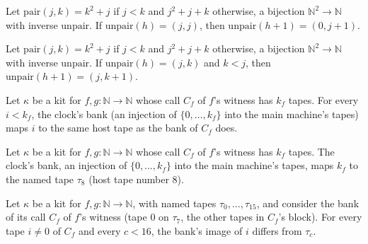 \begin{theorem}
\label{Turing.NTimeDiag.qy_unpair_succ_diag}
\leanok
{}
Let $\mathrm{pair}(j, k) = k^2 + j$ if $j < k$ and $j^2 + j + k$ otherwise, a bijection
$\mathbb{N}^2 \to \mathbb{N}$ with inverse $\mathrm{unpair}$. If $\mathrm{unpair}(h) = (j, j)$, then
$\mathrm{unpair}(h + 1) = (0, j + 1)$.
\end{theorem}

\begin{theorem}
\label{Turing.NTimeDiag.qy_unpair_succ_gt}
\leanok
{}
Let $\mathrm{pair}(j, k) = k^2 + j$ if $j < k$ and $j^2 + j + k$ otherwise, a bijection
$\mathbb{N}^2 \to \mathbb{N}$ with inverse $\mathrm{unpair}$. If $\mathrm{unpair}(h) = (j, k)$ and
$k < j$, then $\mathrm{unpair}(h + 1) = (j, k + 1)$.
\end{theorem}

\begin{theorem}
\label{Turing.NTimeDiag.QyKit.bClk_castSucc}
\leanok
{}
Let $\kappa$ be a kit for $f, g : \mathbb{N} \to \mathbb{N}$ whose call $C_f$ of $f$'s witness has
$k_f$ tapes. For every $i < k_f$, the clock's bank (an injection of $\{0, \dots, k_f\}$ into the
main machine's tapes) maps $i$ to the same host tape as the bank of $C_f$ does.
\end{theorem}

\begin{theorem}
\label{Turing.NTimeDiag.QyKit.bClk_last}
\leanok
{}
Let $\kappa$ be a kit for $f, g : \mathbb{N} \to \mathbb{N}$ whose call $C_f$ of $f$'s witness has
$k_f$ tapes. The clock's bank, an injection of $\{0, \dots, k_f\}$ into the main machine's tapes,
maps $k_f$ to the named tape $\tau_8$ (host tape number $8$).
\end{theorem}

\begin{theorem}
\label{Turing.NTimeDiag.QyKit.bCf_ne}
\leanok
{}
Let $\kappa$ be a kit for $f, g : \mathbb{N} \to \mathbb{N}$, with named tapes $\tau_0, \dots,
\tau_{15}$, and consider the bank of its call $C_f$ of $f$'s witness (tape $0$ on $\tau_7$, the
other tapes in $C_f$'s block). For every tape $i \ne 0$ of $C_f$ and every $c < 16$, the bank's
image of $i$ differs from $\tau_c$.
\end{theorem}

